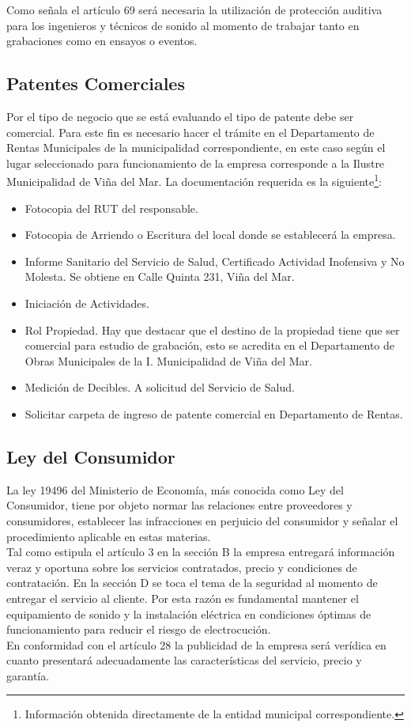Como señala el artículo 69 será necesaria
la utilización de protección auditiva para
los ingenieros y técnicos de sonido al momento
de trabajar tanto en grabaciones como en ensayos
o eventos.

\subsection*{Patentes Comerciales}
Por el tipo de negocio que se está evaluando
el tipo de patente debe ser comercial. Para
este fin es necesario hacer el trámite en el
Departamento de Rentas Municipales de la
municipalidad correspondiente, en este caso
según el lugar seleccionado para funcionamiento
de la empresa corresponde a la Ilustre Municipalidad
de Viña del Mar. La documentación requerida
es la siguiente\footnote{Información obtenida
directamente de la entidad municipal correspondiente.}:

\begin{itemize}
  \item Fotocopia del RUT del responsable.
  \item Fotocopia de Arriendo o Escritura del local donde se establecerá la empresa.
  \item Informe Sanitario del Servicio de Salud, Certificado Actividad Inofensiva y No Molesta. Se obtiene en Calle Quinta 231, Viña del Mar.
  \item Iniciación de Actividades.
  \item Rol Propiedad. Hay que destacar que el destino de la propiedad tiene que ser comercial para estudio de grabación, esto se acredita 
	en el Departamento de Obras Municipales de la I. Municipalidad de Viña del Mar.
  \item Medición de Decibles. A solicitud del Servicio de Salud.
  \item Solicitar carpeta de ingreso de patente comercial en Departamento de Rentas.
\end{itemize}


\subsection*{Ley del Consumidor}
La ley 19496 del Ministerio de Economía, más
conocida como Ley del Consumidor, tiene por objeto 
normar las relaciones entre proveedores y consumidores, 
establecer las infracciones en perjuicio del
consumidor y señalar el procedimiento
aplicable en estas materias.\\

Tal como estipula el artículo 3 en la sección B
la empresa entregará información veraz y oportuna
sobre los servicios contratados, precio y condiciones
de contratación. En la sección D se toca el tema
de la seguridad al momento de entregar el servicio
al cliente. Por esta razón es fundamental mantener
el equipamiento de sonido y la instalación eléctrica
en condiciones óptimas de funcionamiento para reducir
el riesgo de electrocución.\\

En conformidad con el artículo 28 la publicidad de la
empresa será verídica en cuanto presentará adecuadamente
las características del servicio, precio y garantía.

